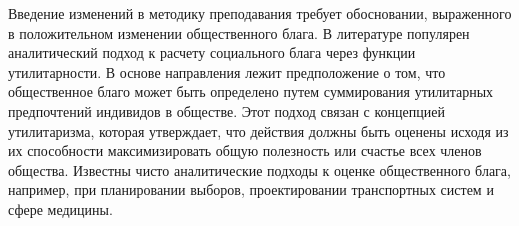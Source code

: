 Введение изменений в методику преподавания требует обосновании, выраженного в положительном изменении общественного блага.
В литературе популярен аналитический подход к расчету социального блага через функции утилитарности.
В основе направления лежит предположение о том, что общественное благо может быть определено путем суммирования утилитарных предпочтений индивидов в обществе.
Этот подход связан с концепцией утилитаризма, которая утверждает, что действия должны быть оценены исходя из их способности максимизировать общую полезность или счастье всех членов общества.
Известны чисто аналитические подходы к оценке общественного блага, например, при планировании выборов, проектировании транспортных систем и сфере медицины.
